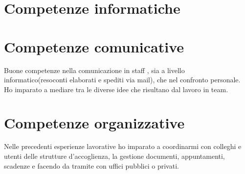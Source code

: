 \documentclass[12pt,a4paper,sans]{moderncv} %
\begin{document}


%
%
%
%

\section{Competenze informatiche}
\section{Competenze comunicative}
Buone competenze nella comunicazione in staff , sia a livello informatico(resoconti elaborati e spediti via mail), che nel confronto personale. Ho imparato a mediare tra le diverse idee che risultano dal lavoro in team.
\section{Competenze organizzative}
Nelle precedenti esperienze lavorative ho imparato a coordinarmi con colleghi e utenti delle strutture d'accoglienza, la gestione  documenti, appuntamenti, scadenze e facendo da tramite con uffici pubblici o privati.
\end{document}
